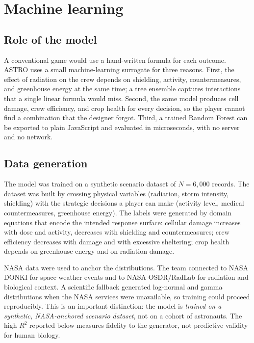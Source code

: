 \documentclass[11pt,a4paper]{article}
\begin{document}
\section{Machine learning}

\subsection{Role of the model}

A conventional game would use a hand-written formula for each outcome. ASTRO uses a small machine-learning surrogate for three reasons. First, the effect of radiation on the crew depends on shielding, activity, countermeasures, and greenhouse energy at the same time; a tree ensemble captures interactions that a single linear formula would miss. Second, the same model produces cell damage, crew efficiency, and crop health for every decision, so the player cannot find a combination that the designer forgot. Third, a trained Random Forest can be exported to plain JavaScript and evaluated in microseconds, with no server and no network.

\subsection{Data generation}

The model was trained on a synthetic scenario dataset of $N=6{,}000$ records. The dataset was built by crossing physical variables (radiation, storm intensity, shielding) with the strategic decisions a player can make (activity level, medical countermeasures, greenhouse energy). The labels were generated by domain equations that encode the intended response surface: cellular damage increases with dose and activity, decreases with shielding and countermeasures; crew efficiency decreases with damage and with excessive sheltering; crop health depends on greenhouse energy and on radiation damage.

NASA data were used to anchor the distributions. The team connected to NASA DONKI for space-weather events and to NASA OSDR/RadLab for radiation and biological context. A scientific fallback generated log-normal and gamma distributions when the NASA services were unavailable, so training could proceed reproducibly. This is an important distinction: the model is \emph{trained on a synthetic, NASA-anchored scenario dataset}, not on a cohort of astronauts. The high $R^2$ reported below measures fidelity to the generator, not predictive validity for human biology.
\end{document}
